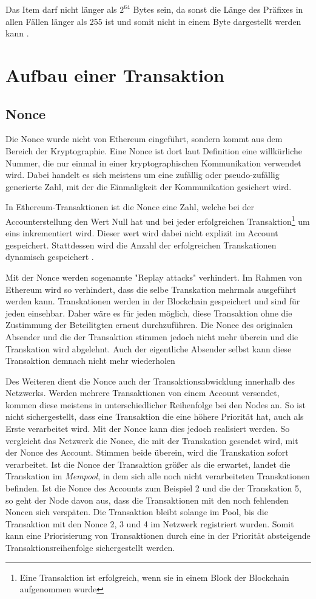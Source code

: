 \documentclass[runningheads]{llncs}
\begin{document}
Das Item darf nicht länger als $2^{64}$ Bytes sein, da sonst die Länge des Präfixes in allen Fällen länger als 255 ist und somit nicht in einem Byte dargestellt werden kann \cite[S.18,19]{wood_ethereum/yellowpaper_2019}.
\section{Aufbau einer Transaktion}

\subsection{Nonce}
\label{nonce}
Die Nonce wurde nicht von Ethereum eingeführt, sondern kommt aus dem Bereich der Kryptographie. Eine Nonce ist dort laut Definition \cite{noauthor_ethereum/wiki/rlp_nodate}
eine willkürliche Nummer, die nur einmal in einer kryptographischen Kommunikation verwendet wird. Dabei handelt es sich meistens um eine zufällig oder pseudo-zufällig generierte Zahl, mit der die Einmaligkeit der Kommunikation gesichert wird.

In Ethereum-Transaktionen ist die Nonce eine Zahl, welche bei der Accounterstellung den Wert Null hat und bei jeder erfolgreichen Transaktion\footnote{Eine Transaktion ist erfolgreich, wenn sie in einem Block der Blockchain aufgenommen wurde} um eins inkrementiert wird. Dieser wert wird dabei nicht explizit im Account gespeichert. Stattdessen wird die Anzahl der erfolgreichen Transkationen dynamisch gespeichert \cite[S.101]{antonopoulos_mastering_2019}.

Mit der Nonce werden sogenannte "Replay attacks" verhindert. Im Rahmen von Ethereum wird so verhindert, dass die selbe Transkation mehrmals ausgeführt werden kann. Transkationen werden in der Blockchain gespeichert und sind für jeden einsehbar. Daher wäre es für jeden möglich, diese Transaktion ohne die Zustimmung der Beteilitgten erneut durchzuführen. Die Nonce des originalen Absender und die der Transaktion stimmen jedoch nicht mehr überein und die Transkation wird abgelehnt. Auch der eigentliche Absender selbst kann diese Transaktion demnach nicht mehr wiederholen

Des Weiteren dient die Nonce auch der Transaktionsabwicklung innerhalb des Netzwerks.  Werden mehrere Transaktionen von einem Account versendet, kommen diese meistens in unterschiedlicher Reihenfolge bei den Nodes an. So ist nicht sichergestellt, dass eine Transaktion die eine höhere Priorität hat, auch als Erste verarbeitet wird. Mit der Nonce kann dies jedoch realisiert werden. So vergleicht das Netzwerk die Nonce, die mit der Transkation gesendet wird, mit der Nonce des Account. Stimmen beide überein, wird die Transkation sofort verarbeitet. Ist die Nonce der Transaktion größer als die erwartet, landet die Transkation im \textit{Mempool}, in dem sich alle noch nicht verarbeiteten Transkationen befinden. Ist die Nonce des Accounts zum Beispiel 2 und die der Transkation 5, so geht der Node davon aus, dass die Transaktionen mit den noch fehlenden Noncen sich verspäten. Die Transaktion bleibt solange im Pool, bis die Transaktion mit den Nonce 2, 3 und 4 im Netzwerk registriert wurden. Somit kann eine Priorisierung von Transaktionen durch eine in der Priorität absteigende Transaktionsreihenfolge sichergestellt werden.
\end{document}
